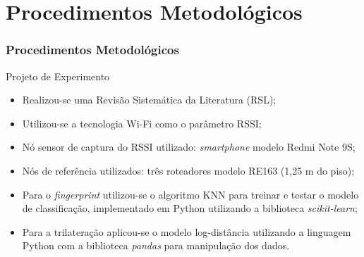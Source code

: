 \documentclass[xcolor={dvipsnames,svgnames,table}]{beamer}
\begin{document}
	\section{Procedimentos Metodológicos}
	\label{procedimentos}
	\begin{frame}
		\frametitle{Procedimentos Metodológicos}
		\begin{block}{Projeto de Experimento}
			\begin{itemize}[label=\textcolor{black}{\textbullet}, left=5pt]
				\justifying
				\item Realizou-se uma Revisão Sistemática da Literatura (RSL);
				\item Utilizou-se a tecnologia Wi-Fi como o parâmetro RSSI;
				\item Nó sensor de captura do RSSI utilizado: \textit{smartphone} modelo Redmi Note 9S;
				\item Nós de referência utilizados: três roteadores modelo RE163 (1,25 m do piso);
				\item Para o \textit{fingerprint} utilizou-se o algoritmo KNN para treinar e testar o modelo de classificação, implementado em Python utilizando a biblioteca \textit{scikit-learn};
				\item Para a trilateração aplicou-se o modelo log-distância utilizando a linguagem Python com a biblioteca \textit{pandas} para manipulação dos dados.
			\end{itemize}
		\end{block}
	\end{frame}
\end{document}
